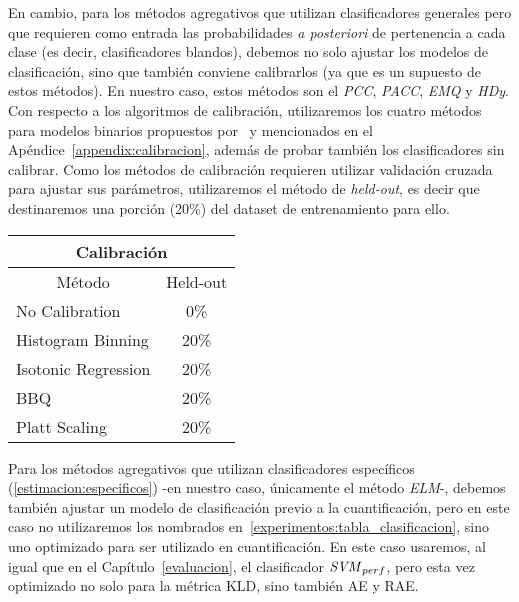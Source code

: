 En cambio, para los métodos agregativos que utilizan clasificadores generales
pero que requieren como entrada las probabilidades {\it a posteriori\/} de
pertenencia a cada clase (es decir, clasificadores blandos), debemos no solo
ajustar los modelos de clasificación, sino que también conviene calibrarlos (ya
que es un supuesto de estos métodos). En nuestro caso, estos métodos son el {\it
PCC}, {\it PACC}, {\it EMQ\/} y {\it HDy}. Con respecto a los algoritmos de
calibración, utilizaremos los cuatro métodos para modelos binarios propuestos
por~\citet{guo2017calibration} y mencionados en el
Apéndice~\ref{appendix:calibracion}, además de probar también los clasificadores
sin calibrar. Como los métodos de calibración requieren utilizar validación
cruzada para ajustar sus parámetros, utilizaremos el método de {\it held-out},
es decir que destinaremos una porción (20\%) del dataset de entrenamiento para
ello.
\begin{center}
    \begin{tabular}{|lc|}
        \hline
        \multicolumn{2}{|c|}{Calibración}                    \\ \hline
        \multicolumn{1}{|c|}{Método}              & Held-out \\ \hline
        \multicolumn{1}{|l|}{No Calibration}      & 0\%      \\
        \multicolumn{1}{|l|}{Histogram Binning}   & 20\%     \\
        \multicolumn{1}{|l|}{Isotonic Regression} & 20\%     \\
        \multicolumn{1}{|l|}{BBQ}                 & 20\%     \\
        \multicolumn{1}{|l|}{Platt Scaling}       & 20\%     \\ \hline
    \end{tabular}
    \label{experimentos:tabla_calibracion}
\end{center}

Para los métodos agregativos que utilizan clasificadores específicos
(\ref{estimacion:especificos}) -en nuestro caso, únicamente el método {\it
ELM\/}-, debemos también ajustar un modelo de clasificación previo a la
cuantificación, pero en este caso no utilizaremos los nombrados
en~\ref{experimentos:tabla_clasificacion}, sino uno optimizado para ser
utilizado en cuantificación. En este caso usaremos, al igual que en el
Capítulo~\ref{evaluacion}, el clasificador \({\it SVM \/}_{perf}\), pero esta
vez optimizado no solo para la métrica KLD, sino también AE y RAE.

